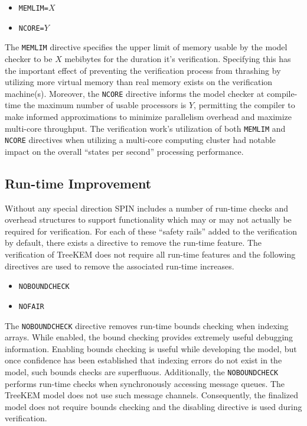 \begin{itemize}
\item
  \texttt{MEMLIM=}\(X\)
\item
  \texttt{NCORE=}\(Y\)
\end{itemize}

The \texttt{MEMLIM} directive specifies the upper limit of memory usable by the model checker to be \(X\) mebibytes for the duration it's verification.
Specifying this has the important effect of preventing the verification process from thrashing by utilizing more virtual memory than real memory exists on the verification machine(s).
Moreover, the \texttt{NCORE} directive informs the model checker at compile-time the maximum number of usable processors is \(Y\), permitting the compiler to make informed approximations to minimize parallelism overhead and maximize multi-core throughput.
The verification work's utilization of both \texttt{MEMLIM} and \texttt{NCORE} directives when utilizing a multi-core computing cluster had notable impact on the overall ``states per second'' processing performance.

\hypertarget{run-time-improvement}{%
\subsection{Run-time Improvement}\label{run-time-improvement}}

Without any special direction SPIN includes a number of run-time checks and overhead structures to support functionality which may or may not actually be required for verification.
For each of these ``safety rails'' added to the verification by default, there exists a directive to remove the run-time feature.
The verification of TreeKEM does not require all run-time features and the following directives are used to remove the associated run-time increases.

\begin{itemize}
\item
  \texttt{NOBOUNDCHECK}
\item
  \texttt{NOFAIR}
\end{itemize}

The \texttt{NOBOUNDCHECK} directive removes run-time bounds checking when indexing arrays.
While enabled, the bound checking provides extremely useful debugging information.
Enabling bounds checking is useful while developing the model, but once confidence has been established that indexing errors do not exist in the model, such bounds checks are superfluous.
Additionally, the \texttt{NOBOUNDCHECK} performs run-time checks when synchronously accessing message queues.
The TreeKEM model does not use such message channels.
Consequently, the finalized model does not require bounds checking and the disabling directive is used during verification.

